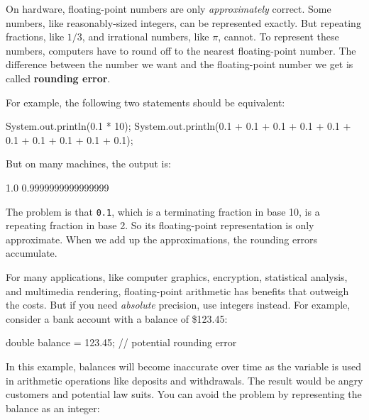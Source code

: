 \documentclass[12pt]{book}
\theoremstyle{exercise}
\newcommand{\java}[1]{\verb"#1"}
\newcommand{\java}[1]{\lstinline{#1}} %
\begin{document}
On hardware, floating-point numbers are only {\it approximately} correct.
Some numbers, like reasonably-sized integers, can be represented exactly.
But repeating fractions, like $1/3$, and irrational numbers, like $\pi$, cannot.
To represent these numbers, computers have to round off to the nearest floating-point number.
The difference between the number we want and the floating-point number we get is called {\bf rounding error}.



For example, the following two statements should be equivalent:

\begin{code}
    System.out.println(0.1 * 10);
    System.out.println(0.1 + 0.1 + 0.1 + 0.1 + 0.1
                     + 0.1 + 0.1 + 0.1 + 0.1 + 0.1);
\end{code}

But on many machines, the output is:

\begin{stdout}
1.0
0.9999999999999999
\end{stdout}

The problem is that \java{0.1}, which is a terminating fraction in base 10, is a repeating fraction in base 2.
So its floating-point representation is only approximate.
When we add up the approximations, the rounding errors accumulate.

For many applications, like computer graphics, encryption, statistical analysis, and multimedia rendering, floating-point arithmetic has benefits that outweigh the costs.
But if you need {\em absolute} precision, use integers instead.
For example, consider a bank account with a balance of \$123.45:

\begin{code}
    double balance = 123.45;  // potential rounding error
\end{code}

In this example, balances will become inaccurate over time as the variable is used in arithmetic operations like deposits and withdrawals.
The result would be angry customers and potential law suits.
You can avoid the problem by representing the balance as an integer:
\end{document}
